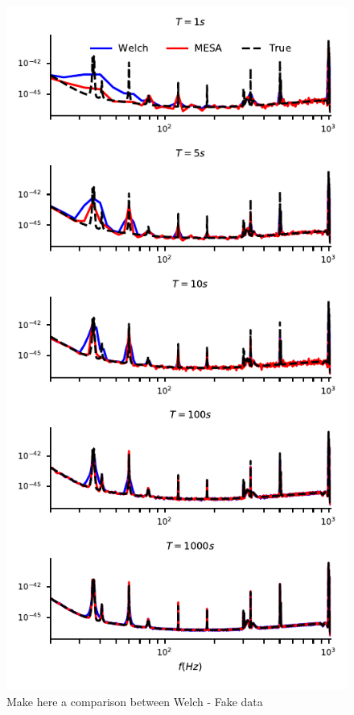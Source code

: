 \documentclass[twocolumn,showpacs,preprintnumbers,nofootinbib,prd,
superscriptaddress,10pt]{revtex4-1}
\begin{document}
\begin{figure}
	\label{fig:mem_welch_fakedata}
	\caption{Make here a comparison between Welch - Fake data}
	\includegraphics{Images/comparison_LVC_data/comparison_LVC_data_overall_fake_True.pdf}
\end{figure}
\end{document}
